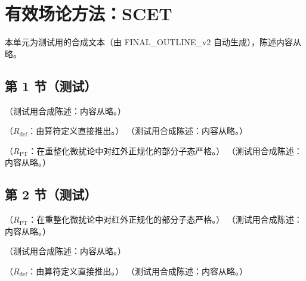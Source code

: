 \chapter{有效场论方法：SCET}\label{ch:scet}
本单元为测试用的合成文本（由 FINAL\_OUTLINE\_v2 自动生成），陈述内容从略。

\section{第 1 节（测试）}\label{sec:scet-modes}

\begin{definition}[模式]\label{def:scet-modes}
（测试用合成陈述：内容从略。）
\end{definition}

\begin{proposition}\label{prop:scet-scalings}
（$R_{\mathrm{def}}$：由算符定义直接推出。）
（测试用合成陈述：内容从略。）
\end{proposition}

\begin{proposition}\label{prop:scet-lagrangian}
（$R_{\mathrm{PT}}$：在重整化微扰论中对红外正规化的部分子态严格。）
（测试用合成陈述：内容从略。）
\end{proposition}

\section{第 2 节（测试）}\label{sec:scet-lagrangian}

\begin{proposition}\label{prop:scet-wilson}
（$R_{\mathrm{PT}}$：在重整化微扰论中对红外正规化的部分子态严格。）
（测试用合成陈述：内容从略。）
\end{proposition}

\begin{example}[$W_n$ 的树图匹配]\label{ex:scet-wn-tree}
（测试用合成陈述：内容从略。）
\end{example}

\begin{proposition}\label{prop:scet-gauge}
（$R_{\mathrm{def}}$：由算符定义直接推出。）
（测试用合成陈述：内容从略。）
\end{proposition}

